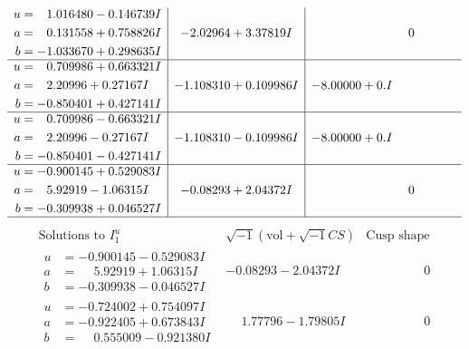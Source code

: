 \documentclass[1p]{elsarticle_modified}
\theoremstyle{definition}
\newcommand{\I}{\sqrt{-1}}
\begin{document}
$$\begin{array}{c|c|c}
\begin{aligned}
u &= \phantom{-}1.016480 - 0.146739 I \\
a &= \phantom{-}0.131558 + 0.758826 I \\
b &= -1.033670 + 0.298635 I\end{aligned}
 & -2.02964 + 3.37819 I & \phantom{-0.000000 } 0 \\ \hline\begin{aligned}
u &= \phantom{-}0.709986 + 0.663321 I \\
a &= \phantom{-}2.20996 + 0.27167 I \\
b &= -0.850401 + 0.427141 I\end{aligned}
 & -1.108310 + 0.109986 I & -8.00000 + 0. I\phantom{ +0.000000I} \\ \hline\begin{aligned}
u &= \phantom{-}0.709986 - 0.663321 I \\
a &= \phantom{-}2.20996 - 0.27167 I \\
b &= -0.850401 - 0.427141 I\end{aligned}
 & -1.108310 - 0.109986 I & -8.00000 + 0. I\phantom{ +0.000000I} \\ \hline\begin{aligned}
u &= -0.900145 + 0.529083 I \\
a &= \phantom{-}5.92919 - 1.06315 I \\
b &= -0.309938 + 0.046527 I\end{aligned}
 & -0.08293 + 2.04372 I & \phantom{-0.000000 } 0\\
 \hline 
 \end{array}$$\newpage$$\begin{array}{c|c|c}  
\text{Solutions to }I^u_{1}& \I (\text{vol} + \sqrt{-1}CS) & \text{Cusp shape}\\
 \hline 
\begin{aligned}
u &= -0.900145 - 0.529083 I \\
a &= \phantom{-}5.92919 + 1.06315 I \\
b &= -0.309938 - 0.046527 I\end{aligned}
 & -0.08293 - 2.04372 I & \phantom{-0.000000 } 0 \\ \hline\begin{aligned}
u &= -0.724002 + 0.754097 I \\
a &= -0.922405 + 0.673843 I \\
b &= \phantom{-}0.555009 - 0.921380 I\end{aligned}
 & \phantom{-}1.77796 - 1.79805 I & \phantom{-0.000000 } 0 \\ \hline\begin{aligned}

\end{aligned}
\end{array}$$
\end{document}
